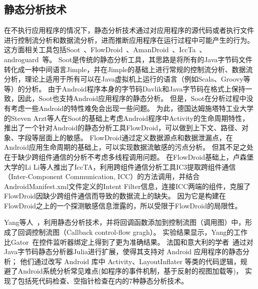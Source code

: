 \subsection{静态分析技术}

在不执行应用程序的情况下，静态分析技术通过对应用程序的源代码或者执行文件进行控制流分析和数据流分析，进而推断应用程序在运行过程中可能产生的行为。
这方面相关工具包括Soot~\cite{vallee1999soot}、FlowDroid~\cite{arzt2014flowdroid}、AmanDroid~\cite{AmanDroid}、IccTa~\cite{iccta}、androguard~\cite{androguard:online}等。
Soot是传统的静态分析工具，其思路是将所有的Java字节码文件转化成一种中间语言Jimple，并在Jimple的基础上进行常规的控制流分析、数据流分析，理论上适用于所有可以在Java虚拟机上运行的语言（例如Scala、Groovy等等）的分析。
由于Android程序本身的字节码Davlik和Java字节码在格式上保持一致，因此，Soot也支持Android应用程序的静态分析。
但是，Soot在分析过程中没有考虑一些Android的特性难免会出现一些问题。
为此，德国达姆施塔特工业大学的Steven Arzt等人在Soot的基础上考虑Android程序中Activity的生命周期特性，推出了一个针对Android的静态分析工具FlowDroid，可以做到上下文、路径、对象、字段等层面上的敏感。
FlowDroid通过定义数据源点和数据泄漏点，在Android应用生命周期的基础上，可以实现数据流敏感的污点分析。
但其不足之处在于缺少跨组件通信的分析不考虑多线程调用问题。
在FlowDroid基础上，卢森堡大学的Li Li等人推出了IccTA，利用跨组件通信分析工具IC3提取跨组件通信（Inter-Component Communication, ICC）的方法调用，并结合AndroidManifest.xml文件定义的Intent Filter信息，连接ICC两端的组件，克服了FlowDroid因缺少跨组件通信而导致的数据流上的缺失。
因为它是构建在FlowDroid之上的一个探测敏感信息泄露的，所以受限于FlowDroid的局限性。

Yang等人~\cite{yang2015static}，利用静态分析技术，并将回调函数添加到控制流图（调用图）中，形成了回调控制流图（Callback control-flow gragh）。
实验结果显示，Yang的工作比Gator~\cite{rountev2014static}在控件监听器绑定上得到了更为准确结果。
法国和意大利的学者~\cite{payet2012static}通过对Java字节码静态分析器Julia进行扩展，使得其支持对 Android 应用程序的静态分析；
他们通过改写 Android 库中 Activity、LayoutInflater 等类的代码逻辑，规避了Android系统分析常见难点(如程序的事件机制，基于反射的视图加载等)，
实现了包括死代码检查、空指针检查在内的7种静态分析技术。





